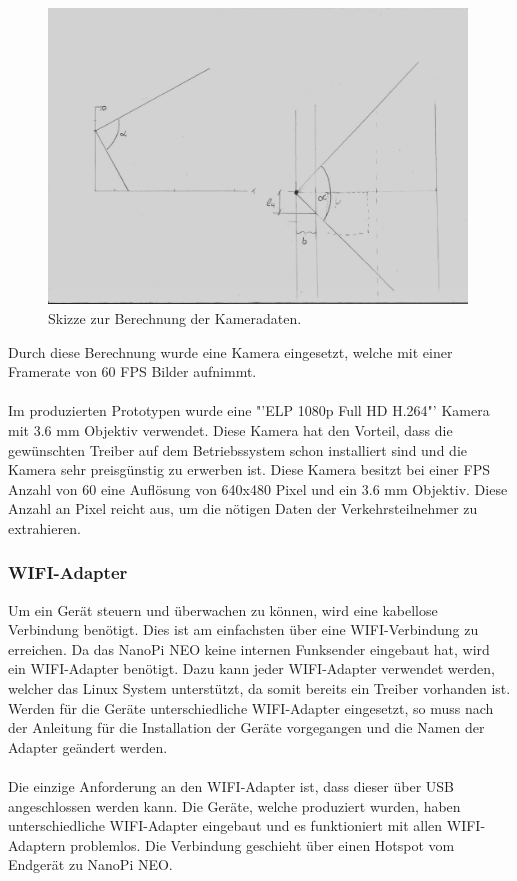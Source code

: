 \begin{figure}[H]
  \centering
  \includegraphics[width=0.99\textwidth]{Hardware/ObjektivBerechnung.jpg} 
  \caption{Skizze zur Berechnung der Kameradaten.}
  \label{bBerechnung}
\end{figure}

Durch diese Berechnung wurde eine Kamera eingesetzt, welche mit einer Framerate von 60 FPS Bilder aufnimmt. \\\\
Im produzierten Prototypen wurde eine "'ELP 1080p Full HD H.264"' Kamera mit 3.6 mm Objektiv verwendet. Diese Kamera hat den Vorteil, dass die gewünschten Treiber auf dem Betriebssystem schon installiert sind und die Kamera sehr preisgünstig zu erwerben ist. Diese Kamera besitzt bei einer FPS Anzahl von 60 eine Auflösung von 640x480 Pixel und ein 3.6 mm Objektiv. Diese Anzahl an Pixel reicht aus, um die nötigen Daten der Verkehrsteilnehmer zu extrahieren. \cite{Kamera}

\subsubsection{WIFI-Adapter}
Um ein Gerät steuern und überwachen zu können, wird eine kabellose Verbindung benötigt. Dies ist am einfachsten über eine WIFI-Verbindung zu erreichen. Da das NanoPi NEO keine internen Funksender eingebaut hat, wird ein WIFI-Adapter benötigt. Dazu kann jeder WIFI-Adapter verwendet werden, welcher das Linux System unterstützt, da somit bereits ein Treiber vorhanden ist. Werden für die Geräte unterschiedliche WIFI-Adapter eingesetzt, so muss nach der Anleitung für die Installation der Geräte vorgegangen und die Namen der Adapter geändert werden.\\\\
Die einzige Anforderung an den WIFI-Adapter ist, dass dieser über USB angeschlossen werden kann. Die Geräte, welche produziert wurden, haben unterschiedliche WIFI-Adapter eingebaut und es funktioniert mit allen WIFI-Adaptern problemlos. Die Verbindung geschieht über einen Hotspot vom Endgerät zu NanoPi NEO.


